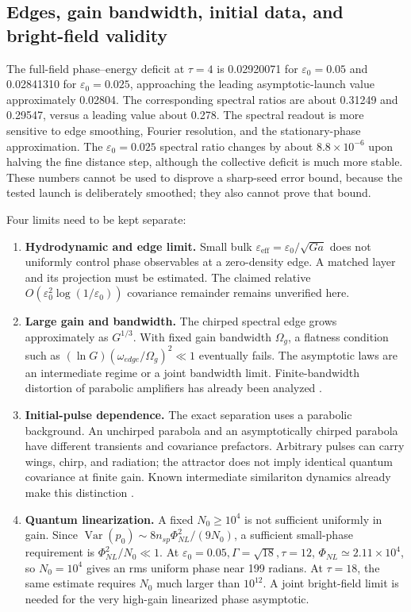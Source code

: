 \documentclass[11pt,a4paper]{article}
\newcommand{\Var}{\operatorname{Var}}
\newcommand{\eps}{\varepsilon}
\begin{document}
\subsection{Edges, gain bandwidth, initial data, and bright-field validity}

The full-field phase--energy deficit at $\tau=4$ is 0.02920071 for $\eps_0=0.05$ and 0.02841310 for $\eps_0=0.025$, approaching the leading asymptotic-launch value approximately 0.02804. The corresponding spectral ratios are about 0.31249 and 0.29547, versus a leading value about 0.278. The spectral readout is more sensitive to edge smoothing, Fourier resolution, and the stationary-phase approximation. The $\eps_0=0.025$ spectral ratio changes by about $8.8\times10^{-6}$ upon halving the fine distance step, although the collective deficit is much more stable. These numbers cannot be used to disprove a sharp-seed error bound, because the tested launch is deliberately smoothed; they also cannot prove that bound.

Four limits need to be kept separate:
\begin{enumerate}
\item \textbf{Hydrodynamic and edge limit.} Small bulk $\eps_{\mathrm{eff}}=\eps_0/\sqrt{Ga}$ does not uniformly control phase observables at a zero-density edge. A matched layer and its projection must be estimated. The claimed relative $O(\eps_0^2\log(1/\eps_0))$ covariance remainder remains unverified here.
\item \textbf{Large gain and bandwidth.} The chirped spectral edge grows approximately as $G^{1/3}$. With fixed gain bandwidth $\Omega_g$, a flatness condition such as $(\ln G)(\omega_{edge}/\Omega_g)^2\ll1$ eventually fails. The asymptotic laws are an intermediate regime or a joint bandwidth limit. Finite-bandwidth distortion of parabolic amplifiers has already been analyzed \cite{soh}.
\item \textbf{Initial-pulse dependence.} The exact separation uses a parabolic background. An unchirped parabola and an asymptotically chirped parabola have different transients and covariance prefactors. Arbitrary pulses can carry wings, chirp, and radiation; the attractor does not imply identical quantum covariance at finite gain. Known intermediate similariton dynamics already make this distinction \cite{wabnitz,kruglov}.
\item \textbf{Quantum linearization.} A fixed $N_0\ge10^4$ is not sufficient uniformly in gain. Since $\Var(p_0)\sim8n_{sp}\Phi_{NL}^2/(9N_0)$, a sufficient small-phase requirement is $\Phi_{NL}^2/N_0\ll1$. At $\eps_0=0.05,\Gamma=\sqrt{18},\tau=12$, $\Phi_{NL}\simeq2.11\times10^4$, so $N_0=10^4$ gives an rms uniform phase near 199 radians. At $\tau=18$, the same estimate requires $N_0$ much larger than $10^{12}$. A joint bright-field limit is needed for the very high-gain linearized phase asymptotic.
\end{enumerate}
\end{document}
